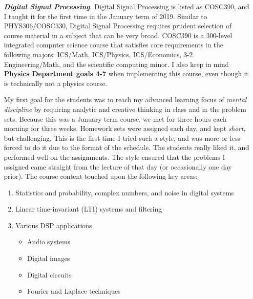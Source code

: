 \documentclass[../../../main.tex]{subfiles}
\begin{document}
\textbf{\textit{Digital Signal Processing}}.  Digital Signal Processing is listed as COSC390, and I taught it for the first time in the January term of 2019.  Similar to PHYS306/COSC330, Digital Signal Processing requires prudent selection of course material in a subject that can be very broad.  COSC390 is a 300-level integrated computer science course that satisfies core requirements in the following majors: ICS/Math, ICS/Physics, ICS/Economics, 3-2 Engineering/Math, and the scientific computing minor.  I also keep in mind \textbf{Physics Department goals 4-7} when implementing this course, even though it is technically not a physics course.  \\ \hspace{0.1cm}

My first goal for the students was to reach my advanced learning focus of \textit{mental discipline} by requiring analytic and creative thinking in class and in the problem sets.  Because this was a January term course, we met for three hours each morning for three weeks.  Homework sets were assigned each day, and kept \textit{short}, but challenging.  This is the first time I tried such a style, and was more or less forced to do it due to the format of the schedule.  The students really liked it, and performed well on the assignments.  The style ensured that the problems I assigned came straight from the lecture of that day (or occasionally one day prior).  The course content touched upon the following key areas:

\begin{enumerate}
\item Statistics and probability, complex numbers, and noise in digital systems
\item Linear time-invariant (LTI) systems and filtering
\item Various DSP applications
\begin{itemize}
\item Audio systems
\item Digital images
\item Digital circuits
\item Fourier and Laplace techniques
\end{itemize}
\end{enumerate}
\end{document}

